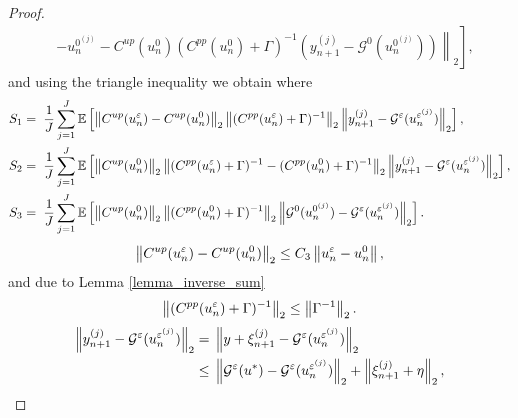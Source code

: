 \documentclass[10pt]{article}
\begin{document}
{\begin{proof}
\begin{align*}
&- \left. \left. u_{n}^{0^{(j)}} - C^{up}(u_n^{0}) (C^{pp}(u_n^{0}) + \Gamma)^{-1} (y_{n+1}^{(j)} - \mathcal{G}^{0}(u_n^{0^{(j)}})) \right \rVert_2 \right ],
\end{align*}
and using the triangle inequality we obtain 
where 
\begin{align}
\label{2}
S_1 &= \; \frac{1}{J} \sum_{j=1}^J \mathbb{E} \left [ \left\|C^{up}(u_n^{\varepsilon}) - C^{up}(u_n^0)\right\|_2 \left\|(C^{pp}(u_n^{\varepsilon}) + \Gamma)^{-1}\right\|_2 \left\|y_{n+1}^{(j)} - \mathcal{G}^{\varepsilon}(u_n^{\varepsilon^{(j)}})\right\|_2 \right ], \\ \label{3}
S_2 &= \; \frac{1}{J} \sum_{j=1}^J \mathbb{E} \left [ \left\|C^{up}(u_n^0)\right\|_2 \left\|(C^{pp}(u_n^{\varepsilon}) + \Gamma)^{-1} - (C^{pp}(u_n^0) + \Gamma)^{-1}\right\|_2 \left\|y_{n+1}^{(j)} - \mathcal{G}^{\varepsilon}(u_n^{\varepsilon^{(j)}})\right\|_2 \right ], \\ \label{4}
S_3 &= \; \frac{1}{J} \sum_{j=1}^J \mathbb{E} \left [ \left\|C^{up}(u_n^0)\right\|_2 \left\|(C^{pp}(u_n^0) + \Gamma)^{-1}\right\|_2 \left\|\mathcal{G}^0(u_n^{0^{(j)}}) - \mathcal{G}^{\varepsilon}(u_n^{\varepsilon^{(j)}})\right\|_2 \right ].
\end{align}
\begin{equation*}
\left\|C^{up}(u_n^{\varepsilon}) - C^{up}(u_n^0)\right\|_2 \le C_3 \left\|u_n^{\varepsilon} - u_n^0\right\|,
\end{equation*}
and due to Lemma \ref{lemma_inverse_sum}
\begin{equation*}
\left\|(C^{pp}(u_n^{\varepsilon}) + \Gamma)^{-1}\right\|_2 \le \left\|\Gamma^{-1}\right\|_2.
\end{equation*}
\begin{align*}
\norm{y_{n+1}^{(j)} - \mathcal{G}^{\varepsilon}(u_n^{\varepsilon^{(j)}})}_2 = & \; \norm{y + \xi_{n+1}^{(j)} - \mathcal{G}^{\varepsilon}(u_n^{\varepsilon^{(j)}})}_2 \\
\le & \; \norm{\mathcal{G}^{\varepsilon}(u^*) - \mathcal{G}^{\varepsilon}(u_n^{\varepsilon^{(j)}})}_2 + \norm{\xi_{n+1}^{(j)} + \eta}_2,

\end{align*}
\end{proof}}
\end{document}
